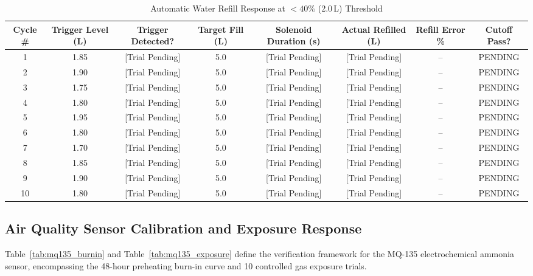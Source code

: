 \begin{table}[htbp!]
\centering
\caption{Automatic Water Refill Response at $<40\%$ (2.0\,L) Threshold}
\label{tab:water_refill_automation}
\begin{adjustbox}{width=\textwidth}
\begin{tabular}{cccccccc}
\toprule
\textbf{Cycle \#} & \textbf{Trigger Level (L)} & \textbf{Trigger Detected?} & \textbf{Target Fill (L)} & \textbf{Solenoid Duration (s)} & \textbf{Actual Refilled (L)} & \textbf{Refill Error \%} & \textbf{Cutoff Pass?} \\
\midrule
1 & 1.85 & [Trial Pending] & 5.0 & [Trial Pending] & [Trial Pending] & -- & PENDING \\
2 & 1.90 & [Trial Pending] & 5.0 & [Trial Pending] & [Trial Pending] & -- & PENDING \\
3 & 1.75 & [Trial Pending] & 5.0 & [Trial Pending] & [Trial Pending] & -- & PENDING \\
4 & 1.80 & [Trial Pending] & 5.0 & [Trial Pending] & [Trial Pending] & -- & PENDING \\
5 & 1.95 & [Trial Pending] & 5.0 & [Trial Pending] & [Trial Pending] & -- & PENDING \\
6 & 1.80 & [Trial Pending] & 5.0 & [Trial Pending] & [Trial Pending] & -- & PENDING \\
7 & 1.70 & [Trial Pending] & 5.0 & [Trial Pending] & [Trial Pending] & -- & PENDING \\
8 & 1.85 & [Trial Pending] & 5.0 & [Trial Pending] & [Trial Pending] & -- & PENDING \\
9 & 1.90 & [Trial Pending] & 5.0 & [Trial Pending] & [Trial Pending] & -- & PENDING \\
10 & 1.80 & [Trial Pending] & 5.0 & [Trial Pending] & [Trial Pending] & -- & PENDING \\
\bottomrule
\end{tabular}
\end{adjustbox}
\end{table}

\subsection{Air Quality Sensor Calibration and Exposure Response}
Table~\ref{tab:mq135_burnin} and Table~\ref{tab:mq135_exposure} define the verification framework for the MQ-135 electrochemical ammonia sensor, encompassing the 48-hour preheating burn-in curve and 10 controlled gas exposure trials.

